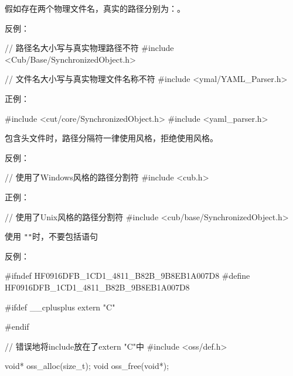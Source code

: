 \begin{content}
假如存在两个物理文件名，真实的路径分别为：。

反例：
\begin{leftbar}
\begin{c++}
// 路径名大小写与真实物理路径不符
#include <Cub/Base/SynchronizedObject.h>

// 文件名大小写与真实物理文件名称不符
#include <ymal/YAML_Parser.h>
\end{c++}
\end{leftbar}

正例：
\begin{leftbar}
\begin{c++}
#include <cut/core/SynchronizedObject.h>
#include <yaml_parser.h>
\end{c++}
\end{leftbar}

\begin{regulation}
包含头文件时，路径分隔符一律使用风格，拒绝使用风格。
\end{regulation}

反例：
\begin{leftbar}
\begin{c++}
// 使用了Windows风格的路径分割符
#include <cub\base\SynchronizedObject.h>
\end{c++}
\end{leftbar}

正例：
\begin{leftbar}
\begin{c++}
// 使用了Unix风格的路径分割符
#include <cub/base/SynchronizedObject.h>
\end{c++}
\end{leftbar}

\begin{regulation}
使用 \texttt{"}\texttt{"}时，不要包括语句
\end{regulation}

反例：
\begin{leftbar}
\begin{c++}[caption={\ttfamily{oss/oss\_memery.h}}]
#ifndef HF0916DFB_1CD1_4811_B82B_9B8EB1A007D8
#define HF0916DFB_1CD1_4811_B82B_9B8EB1A007D8
    
#ifdef  __cplusplus
extern "C" {
#endif

// 错误地将include放在了extern "C"中
#include <oss/def.h>

void* oss_alloc(size_t);
void  oss_free(void*);

}
\end{c++}
\end{leftbar}
\end{content}
